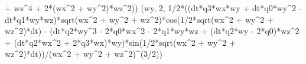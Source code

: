 \documentclass[]{article}
\newenvironment{Shaded}{}{}
\newcommand{\DecValTok}[1]{\textcolor[rgb]{0.25,0.63,0.44}{#1}}
\newcommand{\OperatorTok}[1]{\textcolor[rgb]{0.40,0.40,0.40}{#1}}
\newcommand{\NormalTok}[1]{#1}
\begin{document}
\begin{Shaded}
\begin{Highlighting}[]
\OperatorTok{+}\NormalTok{ wz}\OperatorTok{^}\DecValTok{4} \OperatorTok{+} \DecValTok{2}\OperatorTok{*}\NormalTok{(wx}\OperatorTok{^}\DecValTok{2} \OperatorTok{+}\NormalTok{ wy}\OperatorTok{^}\DecValTok{2}\NormalTok{)}\OperatorTok{*}\NormalTok{wz}\OperatorTok{^}\DecValTok{2}\NormalTok{))}
\NormalTok{(wy, }\DecValTok{2}\NormalTok{, }\DecValTok{1}\OperatorTok{/}\DecValTok{2}\OperatorTok{*}\NormalTok{((dt}\OperatorTok{*}\NormalTok{q3}\OperatorTok{*}\NormalTok{wx}\OperatorTok{*}\NormalTok{wy }\OperatorTok{+}\NormalTok{ dt}\OperatorTok{*}\NormalTok{q0}\OperatorTok{*}\NormalTok{wy}\OperatorTok{^}\DecValTok{2} \OperatorTok{-}\NormalTok{ dt}\OperatorTok{*}\NormalTok{q1}\OperatorTok{*}\NormalTok{wy}\OperatorTok{*}\NormalTok{wz)}\OperatorTok{*}\NormalTok{sqrt(wx}\OperatorTok{^}\DecValTok{2} \OperatorTok{+}\NormalTok{ wy}\OperatorTok{^}\DecValTok{2} \OperatorTok{+}\NormalTok{ wz}\OperatorTok{^}\DecValTok{2}\NormalTok{)}\OperatorTok{*}\NormalTok{cos(}\DecValTok{1}\OperatorTok{/}\DecValTok{2}\OperatorTok{*}\NormalTok{sqrt(wx}\OperatorTok{^}\DecValTok{2} \OperatorTok{+}\NormalTok{ wy}\OperatorTok{^}\DecValTok{2} \OperatorTok{+}\NormalTok{ wz}\OperatorTok{^}\DecValTok{2}\NormalTok{)}\OperatorTok{*}\NormalTok{dt) }\OperatorTok{-}\NormalTok{ (dt}\OperatorTok{*}\NormalTok{q2}\OperatorTok{*}\NormalTok{wy}\OperatorTok{^}\DecValTok{3} \OperatorTok{-} \DecValTok{2}\OperatorTok{*}\NormalTok{q0}\OperatorTok{*}\NormalTok{wx}\OperatorTok{^}\DecValTok{2} \OperatorTok{-} \DecValTok{2}\OperatorTok{*}\NormalTok{q1}\OperatorTok{*}\NormalTok{wy}\OperatorTok{*}\NormalTok{wz }\OperatorTok{+}\NormalTok{ (dt}\OperatorTok{*}\NormalTok{q2}\OperatorTok{*}\NormalTok{wy }\OperatorTok{-} \DecValTok{2}\OperatorTok{*}\NormalTok{q0)}\OperatorTok{*}\NormalTok{wz}\OperatorTok{^}\DecValTok{2} \OperatorTok{+}\NormalTok{ (dt}\OperatorTok{*}\NormalTok{q2}\OperatorTok{*}\NormalTok{wx}\OperatorTok{^}\DecValTok{2} \OperatorTok{+} \DecValTok{2}\OperatorTok{*}\NormalTok{q3}\OperatorTok{*}\NormalTok{wx)}\OperatorTok{*}\NormalTok{wy)}\OperatorTok{*}\NormalTok{sin(}\DecValTok{1}\OperatorTok{/}\DecValTok{2}\OperatorTok{*}\NormalTok{sqrt(wx}\OperatorTok{^}\DecValTok{2} \OperatorTok{+}\NormalTok{ wy}\OperatorTok{^}\DecValTok{2} \OperatorTok{+}\NormalTok{ wz}\OperatorTok{^}\DecValTok{2}\NormalTok{)}\OperatorTok{*}\NormalTok{dt))}\OperatorTok{/}\NormalTok{(wx}\OperatorTok{^}\DecValTok{2} \OperatorTok{+}\NormalTok{ wy}\OperatorTok{^}\DecValTok{2} \OperatorTok{+}\NormalTok{ wz}\OperatorTok{^}\DecValTok{2}\NormalTok{)}\OperatorTok{^}\NormalTok{(}\DecValTok{3}\OperatorTok{/}\DecValTok{2}\NormalTok{))}

\end{Highlighting}
\end{Shaded}
\end{document}
